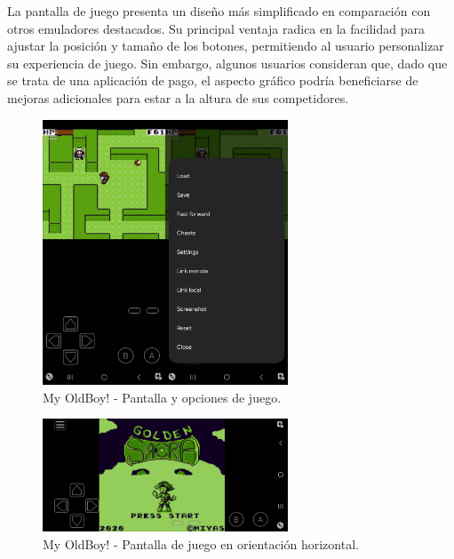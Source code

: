 \clearpage

La pantalla de juego presenta un diseño más simplificado en comparación con otros emuladores destacados. Su principal ventaja radica en la facilidad para ajustar la posición y tamaño de los botones, permitiendo al usuario personalizar su experiencia de juego. Sin embargo, algunos usuarios consideran que, dado que se trata de una aplicación de pago, el aspecto gráfico podría beneficiarse de mejoras adicionales para estar a la altura de sus competidores.

\begin{figure}[h]
    \centering
    \includegraphics[width=0.65\textwidth]{include/images/myoldboy3.jpg}
    \caption{My OldBoy! - Pantalla y opciones de juego.}
    \label{figure:oldboy3}
\end{figure}
\begin{figure}[H]
    \centering
    \includegraphics[width=0.65\textwidth]{include/images/myoldboyportrait.jpg}
    \caption{My OldBoy! - Pantalla de juego en orientación horizontal.}
    \label{figure:oldboy4}
\end{figure}

\clearpage

